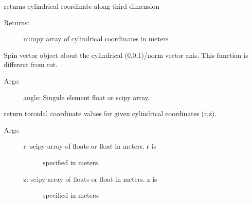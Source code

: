 \documentclass[letterpaper,10pt,english]{sphinxmanual}
\begin{document}
\begin{fulllineitems}
\begin{fulllineitems}
\begin{description}
\end{description}

\end{fulllineitems}


\begin{fulllineitems}
\label{TRIPPy:TRIPPy.geometry.Vec.r2}
returns cylindrical coordinate along third dimension
\begin{description}
\item[{Returns:}] \leavevmode
numpy array of cylindrical coordinates in meters

\end{description}

\end{fulllineitems}


\begin{fulllineitems}
\label{TRIPPy:TRIPPy.geometry.Vec.spin}
Spin vector object about the cylindrical (0,0,1)/norm vector
axis. This function is different from rot.
\begin{description}
\item[{Args:}] \leavevmode
angle: Singule element float or scipy array.

\end{description}

\end{fulllineitems}


\begin{fulllineitems}
\label{TRIPPy:TRIPPy.geometry.Vec.t}
return toroidal coordinate values for given cylindrical
coordinates (r,z).
\begin{description}
\item[{Args:}] \leavevmode\begin{description}
\item[{r: scipy-array of floats or float in meters. r is}] \leavevmode
specified in meters.

\item[{z: scipy-array of floats or float in meters. z is}] \leavevmode
specified in meters.

\end{description}


\end{description}
\end{fulllineitems}
\end{fulllineitems}
\end{document}
